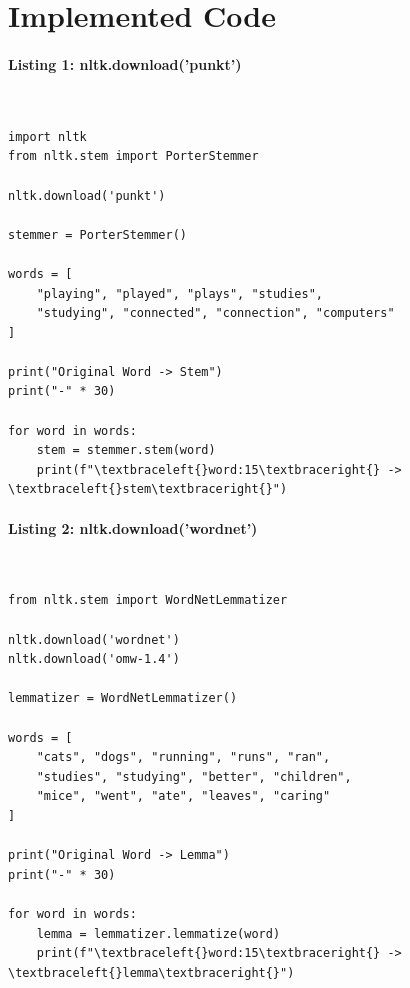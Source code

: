 \documentclass[12pt,a4paper,oneside]{report}
\begin{document}
\section{Implemented Code}
\paragraph{Listing 1: nltk.download('punkt')}\mbox{}\\[-1ex]
\begin{Verbatim}[commandchars=\\\{\},breaklines=true,breakanywhere=true,fontsize=\scriptsize,frame=leftline,framesep=2mm,rulecolor=\color{gray}]
import nltk
from nltk.stem import PorterStemmer

nltk.download('punkt')

stemmer = PorterStemmer()

words = [
    "playing", "played", "plays", "studies",
    "studying", "connected", "connection", "computers"
]

print("Original Word -> Stem")
print("-" * 30)

for word in words:
    stem = stemmer.stem(word)
    print(f"\textbraceleft{}word:15\textbraceright{} -> \textbraceleft{}stem\textbraceright{}")
\end{Verbatim}
\paragraph{Listing 2: nltk.download('wordnet')}\mbox{}\\[-1ex]
\begin{Verbatim}[commandchars=\\\{\},breaklines=true,breakanywhere=true,fontsize=\scriptsize,frame=leftline,framesep=2mm,rulecolor=\color{gray}]
from nltk.stem import WordNetLemmatizer

nltk.download('wordnet')
nltk.download('omw-1.4')

lemmatizer = WordNetLemmatizer()

words = [
    "cats", "dogs", "running", "runs", "ran",
    "studies", "studying", "better", "children",
    "mice", "went", "ate", "leaves", "caring"
]

print("Original Word -> Lemma")
print("-" * 30)

for word in words:
    lemma = lemmatizer.lemmatize(word)
    print(f"\textbraceleft{}word:15\textbraceright{} -> \textbraceleft{}lemma\textbraceright{}")
\end{Verbatim}
\end{document}
